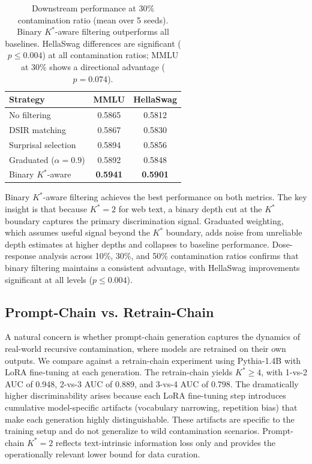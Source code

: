 \documentclass[11pt,a4paper]{article}
\newcommand{\Kstar}{K^{*}}
\begin{document}
\begin{table}[t]
\centering
\small
\begin{tabular}{lcc}
\toprule
\textbf{Strategy} & \textbf{MMLU} & \textbf{HellaSwag} \\
\midrule
No filtering & 0.5865 & 0.5812 \\
DSIR matching & 0.5867 & 0.5830 \\
Surprisal selection & 0.5894 & 0.5856 \\
Graduated ($\alpha{=}0.9$) & 0.5892 & 0.5848 \\
Binary $\Kstar$-aware & \textbf{0.5941} & \textbf{0.5901} \\
\bottomrule
\end{tabular}
\caption{Downstream performance at 30\% contamination ratio (mean over 5 seeds). Binary $\Kstar$-aware filtering outperforms all baselines. HellaSwag differences are significant ($p \leq 0.004$) at all contamination ratios; MMLU at 30\% shows a directional advantage ($p = 0.074$).}
\label{tab:curation}
\end{table}

Binary $\Kstar$-aware filtering achieves the best performance on both metrics. The key insight is that because $\Kstar = 2$ for web text, a binary depth cut at the $\Kstar$ boundary captures the primary discrimination signal. Graduated weighting, which assumes useful signal beyond the $\Kstar$ boundary, adds noise from unreliable depth estimates at higher depths and collapses to baseline performance. Dose-response analysis across 10\%, 30\%, and 50\% contamination ratios confirms that binary filtering maintains a consistent advantage, with HellaSwag improvements significant at all levels ($p \leq 0.004$).

\subsection{Prompt-Chain vs. Retrain-Chain}

A natural concern is whether prompt-chain generation captures the dynamics of real-world recursive contamination, where models are retrained on their own outputs. We compare against a retrain-chain experiment using Pythia-1.4B with LoRA fine-tuning at each generation. The retrain-chain yields $\Kstar \geq 4$, with 1-vs-2 AUC of 0.948, 2-vs-3 AUC of 0.889, and 3-vs-4 AUC of 0.798. The dramatically higher discriminability arises because each LoRA fine-tuning step introduces cumulative model-specific artifacts (vocabulary narrowing, repetition bias) that make each generation highly distinguishable. These artifacts are specific to the training setup and do not generalize to wild contamination scenarios. Prompt-chain $\Kstar = 2$ reflects text-intrinsic information loss only and provides the operationally relevant lower bound for data curation.
\end{document}
